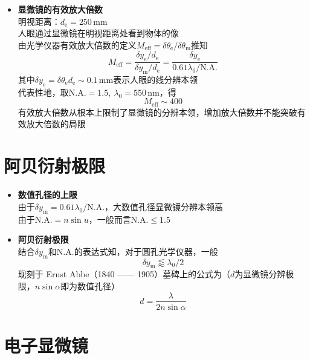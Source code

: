 \documentclass{beamer}
\newenvironment{slide}{
    \begin{frame}{\bfseries{\sectiontitle}}
}{
    \end{frame}
}
\newenvironment{itemlist}{
  \begin{itemize}
    \let\itemonly\item
    \renewcommand{\item}[1]{\itemonly \textbf{##1} \\}
    \setlength{\itemsep}{1em}
}{
  \end{itemize}
}
\let\sectiononly\section
\renewcommand{\section}[1]{
    \sectiononly{#1}
    \let\sectiontitle\relax
    \newcommand{\sectiontitle}{#1}
}
\begin{document}
\begin{slide}
  \begin{itemlist}
    \item{显微镜的有效放大倍数}
      明视距离：$d_{\mathrm e} = 250\,\mathrm{mm}$ \\
      人眼通过显微镜在明视距离处看到物体的像 \\
      由光学仪器有效放大倍数的定义$M_{\mathrm{eff}} = \delta\theta_{\mathrm e} / \delta\theta_{\mathrm m}$推知
      $$
      \boxed{
        M_{\mathrm{eff}} = \frac{\delta y_{\mathrm e} / d_{\mathrm e}}{\delta y_{\mathrm m} / d_{\mathrm e}}
        = \frac{\delta y_{\mathrm e}}{0.61\lambda_0 / \mathrm{N.A.}}
      }
      $$
      其中$\delta y_{\mathrm e} = \delta\theta_{\mathrm e}d_{\mathrm e} \sim 0.1\,\mathrm{mm}$表示人眼的线分辨本领 \\
      代表性地，取$\mathrm{N.A.} = 1.5,\ \lambda_0 = 550\,\mathrm{nm}$，得
      $$\boxed{M_{\mathrm{eff}} \sim 400}$$
      有效放大倍数从根本上限制了显微镜的分辨本领，增加放大倍数并不能突破有效放大倍数的局限
  \end{itemlist}
\end{slide}

\section{阿贝衍射极限}

\begin{slide}
  \begin{itemlist}
    \item{数值孔径的上限}
      由于$\delta y_{\mathrm m} = 0.61\lambda_0 / \mathrm{N.A.}$，大数值孔径显微镜分辨本领高 \\
      由于$\mathrm{N.A.} = n\sin u$，一般而言$\mathrm{N.A.} \leq 1.5$
    \item{阿贝衍射极限}
      结合$\delta y_{\mathrm m}$和$\mathrm{N.A.}$的表达式知，对于圆孔光学仪器，一般
      $$\boxed{\delta y_{\mathrm m} \lessapprox \lambda_0 / 2}$$
      现刻于 Ernst Abbe（1840 —— 1905）墓碑上的公式为（$d$为显微镜分辨极限，$n\sin\alpha$即为数值孔径）
      $$\boxed{d = \frac{\lambda}{2n\sin\alpha}}$$
  \end{itemlist}
\end{slide}

\section{电子显微镜}
\end{document}

